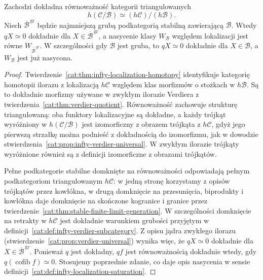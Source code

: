 \begin{wniosek}\label{cat:cor:infty-verdier-homotopy}
Zachodzi dokładna równoważność kategorii triangulowanych
\[
 h(\mathcal C/\mathcal B)\simeq (h\mathcal C)/(h\mathcal B).
\]
Niech $\overline{\mathcal B}^{\,\mathrm{gr}}$ będzie najmniejszą grubą podkategorią stabilną zawierającą $\mathcal B$. Wtedy $qX\simeq0$ dokładnie dla $X\in\overline{\mathcal B}^{\,\mathrm{gr}}$, a nasycenie klasy $W_{\mathcal B}$ względem lokalizacji jest równe $W_{\overline{\mathcal B}^{\,\mathrm{gr}}}$. W szczególności gdy $\mathcal B$ jest gruba, to $qX\simeq0$ dokładnie dla $X\in\mathcal B$, a $W_{\mathcal B}$ jest już nasycona.
\end{wniosek}
\begin{proof}
Twierdzenie~\ref{cat:thm:infty-localization-homotopy} identyfikuje kategorię homotopii ilorazu z lokalizacją $h\mathcal C$ względem klas morfizmów o stożkach w $h\mathcal B$. Są to dokładnie morfizmy używane w zwykłym ilorazie Verdiera z twierdzenia~\ref{cat:thm:verdier-quotient}. Równoważność zachowuje strukturę triangulowaną: oba funktory lokalizacyjne są dokładne, a każdy trójkąt wyróżniony w $h(\mathcal C/\mathcal B)$ jest izomorficzny z obrazem trójkąta z $h\mathcal C$, gdyż jego pierwszą strzałkę można podnieść z dokładnością do izomorfizmu, jak w dowodzie stwierdzenia~\ref{cat:prop:infty-verdier-universal}. W zwykłym ilorazie trójkąty wyróżnione również są z definicji izomorficzne z obrazami trójkątów.

Pełne podkategorie stabilne domknięte na równoważności odpowiadają pełnym podkategoriom triangulowanym $h\mathcal C$: w jedną stronę korzystamy z opisów trójkątów przez kowłókna, w drugą domknięcie na przesunięcia, biprodukty i kowłókna daje domknięcie na skończone kogranice i granice przez twierdzenie~\ref{cat:thm:stable-finite-limit-generation}. W szczególności domknięcie na retrakty w $h\mathcal C$ jest dokładnie warunkiem grubości przyjętym w definicji~\ref{cat:def:infty-verdier-subcategory}. Z opisu jądra zwykłego ilorazu (stwierdzenie~\ref{cat:prop:verdier-universal}) wynika więc, że $qX\simeq0$ dokładnie dla $X\in\overline{\mathcal B}^{\,\mathrm{gr}}$. Ponieważ $q$ jest dokładny, $qf$ jest równoważnością dokładnie wtedy, gdy $q(\operatorname{cofib}f)\simeq0$. Stosujemy poprzednie zdanie, co daje opis nasycenia w sensie definicji~\ref{cat:def:infty-localization-saturation}.
\end{proof}

